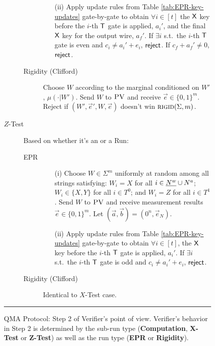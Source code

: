 \begin{figure}[H]
\begin{description}
\begin{description}
\begin{enumerate}
		\item[(ii)] Apply update rules from Table \ref{tab:EPR-key-updates} gate-by-gate to obtain $\forall i\in [t]$ the $\sf X$ key before the $i$-th $\sf T$ gate is applied, $a_i'$, and the final $\sf X$ key for the output wire, $a_f'$. 
If $\exists i$ s.t.\ the $i$-th $\sf T$ gate is even and $c_i\neq a_i'+e_i$, $\sf reject$. If $c_f+a_f'\neq 0$, $\sf reject$. 
	\end{enumerate}
	\item[Rigidity (Clifford)] Choose ${W}$ according to the marginal conditioned on ${W}'$, $\mu(\cdot|{W}')$. 
	Send ${W}$ to $\textsc{PV}$ and receive $\vec{e}\in\{0,1\}^m$. Reject if   $({W}',\vec{e}',{W},\vec{e})$ doesn't win $\textsc{rigid}(\Sigma,m)$. 
\end{description}

\item[$Z$-Test] Based on whether it's an  or a  Run:
\begin{description}
	\item[EPR] 
	\begin{enumerate}
		\item[(i)] Choose $W\in\Sigma^m$ uniformly at random among all strings
      satisfying: $W_i=X$ for all $i\in \highlight{N^w} \cup N^a$; $W_i\in\{X,Y\}$ for all $i\in T^0$; and $W_i=Z$ for all $i\in T^1$. Send $W$ to $\textsc{PV}$ and receive measurement results $\vec{e}\in\{0,1\}^m$. Let $(\vec{a},\vec{b})=(0^n,\vec{e}_N)$.
		\item[(ii)] Apply update rules from Table \ref{tab:EPR-key-updates} gate-by-gate to obtain $\forall i\in [t]$, the $\sf X$ key before the $i$-th $\sf T$ gate is applied, $a_i'$. 
If $\exists i$ s.t.\ the $i$-th $\sf T$ gate is odd and $c_i\neq a_i'+e_i$, $\sf reject$. 
	\end{enumerate}
	\item[Rigidity (Clifford)] Identical to $X$-Test case.
\end{description}
\end{description}
\rule[2ex]{\textwidth}{0.5pt}\vspace{-.5cm}
\caption{QMA Protocol: Step 2 of Verifier's point of view. Verifier's behavior in Step 2 is determined by the sub-run type (\textbf{Computation}, \textbf{X-Test} or \textbf{Z-Test}) as well as the run type (\textbf{EPR} or \textbf{Rigidity}).}\label{fig:qma-protocol-V-continued}
\end{figure}


